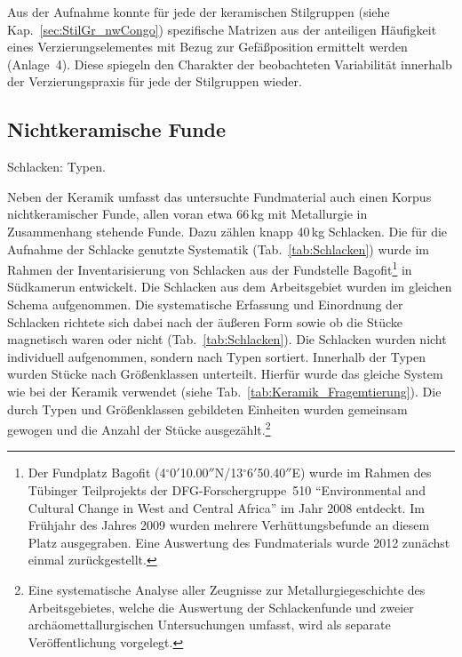 Aus der Aufnahme konnte für jede der keramischen Stilgruppen (siehe Kap.~\ref{sec:StilGr_nwCongo}) spezifische Matrizen aus der anteiligen Häufigkeit eines Verzierungselementes mit Bezug zur Gefäßposition ermittelt werden (Anlage~4). Diese spiegeln den Charakter der beobachteten Variabilität innerhalb der Verzierungspraxis für jede der Stilgruppen wieder.





\subsection{Nichtkeramische Funde}

\begin{table*}[!tb]
\centering
\resizebox{\textwidth}{!}{%
}
\caption{Schlacken: Typen.}
\label{tab:Schlacken}
\end{table*}

Neben der Keramik umfasst das untersuchte Fundmaterial auch einen Korpus nichtkeramischer Funde, allen voran etwa 66\,kg mit Metallurgie in Zusammenhang stehende Funde. Dazu zählen knapp 40\,kg Schlacken. Die für die Aufnahme der Schlacke genutzte Systematik (Tab.~\ref{tab:Schlacken}) wurde im Rahmen der Inventarisierung von Schlacken aus der Fundstelle Bagofit\footnote{Der Fundplatz Bagofit (4$^\circ$0$'$10.00$''$N/13$^\circ$6$'$50.40$''$E) wurde im Rahmen des Tübinger Teilprojekts der DFG-Forschergruppe~510 \enquote{Environmental and Cultural Change in West and Central Africa} im Jahr 2008 entdeckt. Im Frühjahr des Jahres 2009 wurden mehrere Verhüttungsbefunde an diesem Platz ausgegraben. Eine Auswertung des Fundmaterials wurde 2012 zunächst einmal zurückgestellt.} in Südkamerun entwickelt. Die Schlacken aus dem Arbeitsgebiet wurden im gleichen Schema aufgenommen. Die systematische Erfassung und Einordnung der Schlacken richtete sich dabei nach der äußeren Form sowie ob die Stücke magnetisch waren oder nicht (Tab.~\ref{tab:Schlacken}). Die Schlacken wurden nicht individuell aufgenommen, sondern nach Typen sortiert. Innerhalb der Typen wurden Stücke nach Größenklassen unterteilt. Hierfür wurde das gleiche System wie bei der Keramik verwendet (siehe Tab.~\ref{tab:Keramik_Fragemtierung}). Die durch Typen und Größenklassen gebildeten Einheiten wurden gemeinsam gewogen und die Anzahl der Stücke ausgezählt.\footnote{Eine systematische Analyse aller Zeugnisse zur Metallurgiegeschichte des Arbeitsgebietes, welche die Auswertung der Schlackenfunde und zweier archäomettallurgischen Untersuchungen umfasst, wird als separate Veröffentlichung vorgelegt.}

